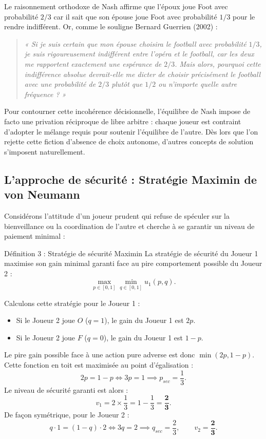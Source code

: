 \documentclass[11pt,a4paper]{article}
\begin{document}
Le raisonnement orthodoxe de Nash affirme que l'époux joue Foot avec probabilité $2/3$ car il sait que son épouse joue Foot avec probabilité $1/3$ pour le rendre indifférent. Or, comme le souligne Bernard Guerrien (2002) :
\begin{quote}
\textit{« Si je suis certain que mon épouse choisira le football avec probabilité $1/3$, je suis rigoureusement indifférent entre l'opéra et le football, car les deux me rapportent exactement une espérance de $2/3$. Mais alors, pourquoi cette indifférence absolue devrait-elle me dicter de choisir précisément le football avec une probabilité de $2/3$ plutôt que $1/2$ ou n'importe quelle autre fréquence ? »}
\end{quote}

Pour contourner cette incohérence décisionnelle, l'équilibre de Nash impose de facto une privation réciproque de libre arbitre : chaque joueur est contraint d'adopter le mélange requis pour soutenir l'équilibre de l'autre. Dès lors que l'on rejette cette fiction d'absence de choix autonome, d'autres concepts de solution s'imposent naturellement.

\subsection{L'approche de sécurité : Stratégie Maximin de von Neumann}
Considérons l'attitude d'un joueur prudent qui refuse de spéculer sur la bienveillance ou la coordination de l'autre et cherche à se garantir un niveau de paiement minimal :

\begin{propbox}{Définition 3 : Stratégie de sécurité Maximin}
La stratégie de sécurité du Joueur 1 maximise son gain minimal garanti face au pire comportement possible du Joueur 2 :
\begin{equation}
\max_{p \in [0, 1]} \min_{q \in [0, 1]} u_1(p, q).
\end{equation}
\end{propbox}

Calculons cette stratégie pour le Joueur 1 :
\begin{itemize}[leftmargin=1.5em]
    \item Si le Joueur 2 joue $O$ ($q = 1$), le gain du Joueur 1 est $2p$.
    \item Si le Joueur 2 joue $F$ ($q = 0$), le gain du Joueur 1 est $1 - p$.
\end{itemize}
Le pire gain possible face à une action pure adverse est donc $\min(2p, 1 - p)$. Cette fonction en toit est maximisée au point d'égalisation :
\[
2p = 1 - p \iff 3p = 1 \implies \boxed{p_{sec} = \frac{1}{3}}.
\]
Le niveau de sécurité garanti est alors :
\begin{equation}
v_1 = 2 \times \frac{1}{3} = 1 - \frac{1}{3} = \mathbf{\frac{2}{3}}.
\end{equation}
De façon symétrique, pour le Joueur 2 :
\[
q \cdot 1 = (1 - q) \cdot 2 \iff 3q = 2 \implies \boxed{q_{sec} = \frac{2}{3}}, \qquad v_2 = \mathbf{\frac{2}{3}}.
\]
\end{document}
